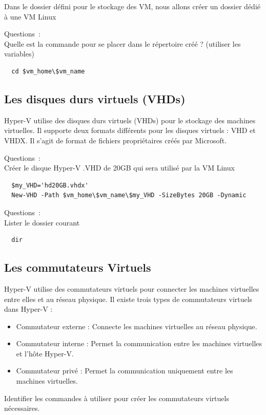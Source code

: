 \noindent Dans le dossier défini pour le stockage des VM, nous allons créer un dossier dédié à une VM Linux

\vspace{0.5cm}

Questions~: \\
Quelle est la commande pour se placer dans le répertoire créé ? (utiliser les variables)

\begin{verbatim}
  cd $vm_home\$vm_name
\end{verbatim}

\subsection*{Les disques durs virtuels (VHDs)}
{}
\noindent Hyper-V utilise des disques durs virtuels (VHDs) pour le stockage des machines virtuelles. Il supporte deux formats différents pour les disques virtuels : VHD et VHDX. Il s'agit de format de fichiers propriétaires créés par Microsoft.

\vspace{0.5cm}

Questions~: \\
Créer le disque Hyper-V .VHD de 20GB qui sera utilisé par la VM Linux

\begin{verbatim}
  $my_VHD='hd20GB.vhdx'
  New-VHD -Path $vm_home\$vm_name\$my_VHD -SizeBytes 20GB -Dynamic
\end{verbatim}

\vspace{0.5cm}

Questions~: \\
Lister le dossier courant

\begin{verbatim}
  dir
\end{verbatim}

\newpage

\subsection*{Les commutateurs Virtuels}
{}
\noindent Hyper-V utilise des commutateurs virtuels pour connecter les machines virtuelles entre elles et au réseau physique. Il existe trois types de commutateurs virtuels dans Hyper-V :
\begin{itemize}
  \item Commutateur externe : Connecte les machines virtuelles au réseau physique.
  \item Commutateur interne : Permet la communication entre les machines virtuelles et l'hôte Hyper-V.
  \item Commutateur privé : Permet la communication uniquement entre les machines virtuelles.
\end{itemize}
Identifier les commandes à utiliser pour créer les commutateurs virtuels nécessaires.

